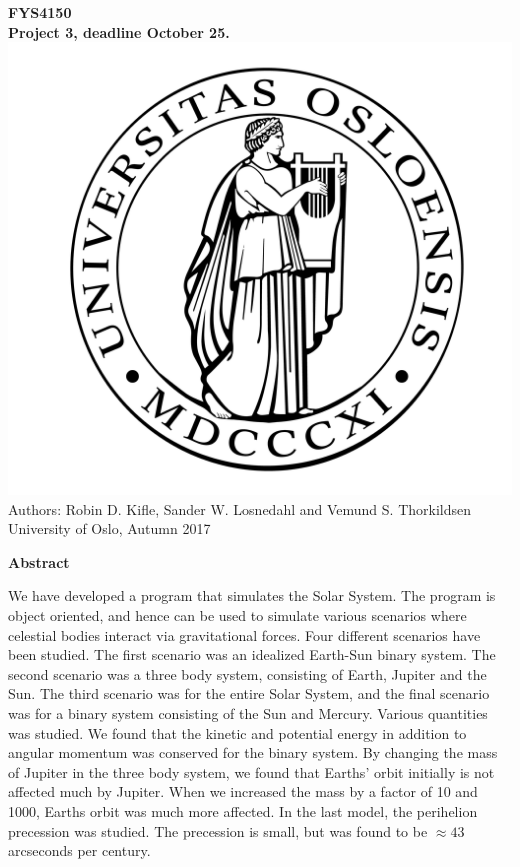 \documentclass[10pt,a4paper]{article}
\begin{document}
\begin{center}
{\LARGE\bf
FYS4150\\
Project 3, deadline October 25.
}
 \includegraphics[scale=0.075]{uio.png}\\
Authors: Robin D. Kifle, Sander W. Losnedahl and Vemund S. Thorkildsen\\
University of Oslo, Autumn 2017

\vspace{3cm}
{\LARGE\bf
Abstract
}\\
\end{center}
We have developed a program that simulates the Solar System. The program is object oriented, and hence can be used to simulate various scenarios where celestial bodies interact via gravitational forces. Four different scenarios have been studied. The first scenario was an idealized Earth-Sun binary system. The second scenario was a three body system, consisting of Earth, Jupiter and the Sun. The third scenario was for the entire Solar System, and the final scenario was for a binary system consisting of the Sun and Mercury. Various quantities was studied. We found that the kinetic and potential energy in addition to angular momentum was conserved for the binary system. By changing the mass of Jupiter in the three body system, we found that Earths' orbit initially is not affected much by Jupiter. When we increased the mass by a factor of 10 and 1000, Earths orbit was much more affected. In the last model, the perihelion precession was studied. The precession is small, but was found to be $\approx 43$ arcseconds per century. 
\newpage
\end{document}
